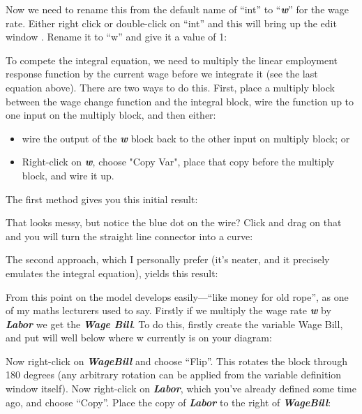 \begin{center}
\end{center}


Now we need to rename this from the default name of ``int'' to
``{\em\bf w}'' for the wage rate. Either right click or double-click
on ``int'' and this will bring up the edit window . Rename it to ``w'' and
give it a value of 1: 

\begin{center}
\end{center}

To compete the integral equation, we need to multiply the linear
employment response function by the current wage before we integrate
it (see the last equation above). There are two ways to do
this. First, place a multiply block between the wage change function
and the integral block, wire the function up to one input on the
multiply block, and then either:

\begin{itemize}
\item wire the output of the {\bf\em w} block back to the other input
on multiply block; or
\item Right-click on {\bf\em w}, choose "Copy Var", place that copy
before the multiply block, and wire it up.
\end{itemize}

The first method gives you this initial result:


That looks messy, but notice the blue dot on the wire? Click and drag
on that and you will turn the straight line connector into a curve: 


The second approach, which I personally prefer (it's neater, and it
precisely emulates the integral equation), yields this result: 


From this point on the model develops easily---``like money for old
rope'', as one of my maths lecturers used to say. Firstly if we
multiply the wage rate {\bf\em w} by {\bf\em Labor} we get the {\em\bf
Wage Bill}. To do this,
firstly create the variable Wage Bill, and put will well below where w
currently is on your diagram: 


Now right-click on {\bf\em WageBill} and choose ``Flip''. This rotates
the block through 180 degrees (any arbitrary rotation can be applied
from the variable definition window itself). Now right-click on
{\bf\em Labor}, which you've already defined some time ago, and choose
``Copy''. Place the copy of {\bf\em Labor} to the right of {\bf\em
WageBill}:

